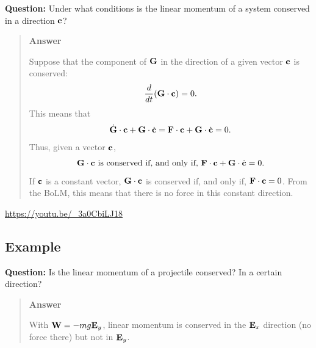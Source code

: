 \documentclass[
  letterpaper,
  DIV=11,
  numbers=noendperiod]{scrreprt}
\begin{document}
\begin{tcolorbox}[enhanced jigsaw, arc=.35mm, bottomrule=.15mm, bottomtitle=1mm, breakable, colback=white, colbacktitle=quarto-callout-tip-color!10!white, colframe=quarto-callout-tip-color-frame, coltitle=black, left=2mm, leftrule=.75mm, opacityback=0, opacitybacktitle=0.6, rightrule=.15mm, title=\textcolor{quarto-callout-tip-color}{\faLightbulb}\hspace{0.5em}{Think!}, titlerule=0mm, toprule=.15mm, toptitle=1mm]

\textbf{Question:} Under what conditions is the linear momentum of a
system conserved in a direction \({\bf c}\)?

\begin{quote}
\textbf{Answer}

Suppose that the component of \({\bf G}\) in the direction of a given
vector \({\bf c}\) is conserved: \begin{align}
    \frac{d}{dt}({\bf G}\cdot{\bf c}) = 0.
\end{align} This means that \begin{align}
    \dot{\bf G}\cdot{\bf c}+{\bf G}\cdot\dot{\bf c} = {\bf F}\cdot{\bf c}+{\bf G}\cdot\dot{\bf c} = 0.
\end{align} Thus, given a vector \({\bf c}\),
\[{\bf G}\cdot{\bf c} \text{ is conserved if, and only if, } {\bf F}\cdot{\bf c}+{\bf G}\cdot\dot{\bf c} = 0.\]
If \({\bf c}\) is a constant vector, \({\bf G}\cdot{\bf c}\) is
conserved if, and only if, \({\bf F}\cdot{\bf c} = 0\). From the BoLM,
this means that there is no force in this constant direction.
\end{quote}

\end{tcolorbox}

\url{https://youtu.be/_3a0CbiLJ18}

\subsection{Example}\label{example-1}

\begin{tcolorbox}[enhanced jigsaw, arc=.35mm, bottomrule=.15mm, bottomtitle=1mm, breakable, colback=white, colbacktitle=quarto-callout-warning-color!10!white, colframe=quarto-callout-warning-color-frame, coltitle=black, left=2mm, leftrule=.75mm, opacityback=0, opacitybacktitle=0.6, rightrule=.15mm, title=\textcolor{quarto-callout-warning-color}{\faExclamationTriangle}\hspace{0.5em}{Example}, titlerule=0mm, toprule=.15mm, toptitle=1mm]

\textbf{Question:} Is the linear momentum of a projectile conserved? In
a certain direction?

\begin{quote}
\textbf{Answer}

With \({\bf W} = -mg{\bf E}_y\), linear momentum is conserved in the
\({\bf E}_x\) direction (no force there) but not in \({\bf E}_y\).
\end{quote}

\end{tcolorbox}
\end{document}
